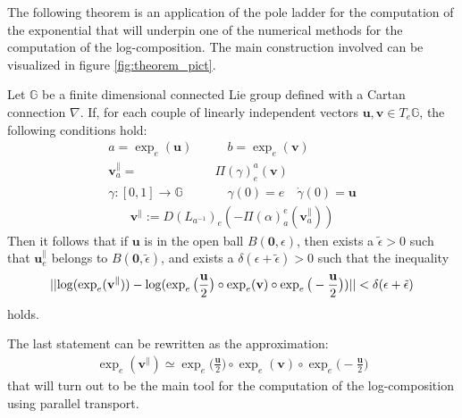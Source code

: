 \noindent
The following theorem is an application of the pole ladder \cite{lorenzi2011schild} for the computation of the exponential that will underpin one of the numerical methods for the computation of the log-composition. The main construction involved can be visualized in figure \ref{fig:theorem_pict}.
\begin{theorem}\label{th:local_approximation_theorem}
	Let $\mathbb{G}$ be a finite dimensional connected Lie group defined with a Cartan connection $\nabla$. 
	If, for each couple of linearly independent vectors $\mathbf{u}, \mathbf{v} \in T_{e}\mathbb{G}$, the following conditions hold:
	\begin{align*}
	a = \exp_{e}(\mathbf{u}) 
	\quad & \quad  
	b = \exp_{e}(\mathbf{v}) \\
	\mathbf{v}_{a}^{\parallel} = & \Pi(\gamma)_{e}^{a}(\mathbf{v})\\
	\gamma : [0,1] \rightarrow \mathbb{G} &\quad \gamma(0) = e \quad \dot{\gamma}(0) = \mathbf{u}
	\end{align*}
	\begin{align*}
	 \mathbf{v}^{\parallel} := D(L_{a^{-1}})_{e}( -\Pi(\alpha)_{a}^{e}(\mathbf{v}_{a}^{\parallel}))
	\end{align*}
	Then it follows that if $\mathbf{u}$ is in the open ball $B(\mathbf{0}, \epsilon)$, then exists a  $\tilde{\epsilon}>0$ such that $\mathbf{u}_{e}^{\parallel}$ belongs to $B(\mathbf{0}, \tilde{\epsilon})$, and exists a $\delta(\epsilon + \tilde{\epsilon})>0$ such that the inequality
	\begin{align*}
		\vert\lvert 
			\log(\exp_{e}(\mathbf{v}^{\parallel} ))
			-
			\log(\exp_{e}\big(\frac{\mathbf{u}}{2}\big)   
				\circ  \exp_{e}(\mathbf{v}) 
				\circ \exp_{e}\big(-\frac{\mathbf{u}}{2}\big))
			 \rvert\vert <\delta(\epsilon + \tilde{\epsilon})
	\end{align*}
	holds.
\end{theorem}
\noindent
The last statement can be rewritten as the approximation:
\begin{align}\label{eq:parallel_transport_main_approximation}
\exp_{e}(\mathbf{v}^{\parallel}) 
\simeq
\exp_{e}\big(\frac{\mathbf{u}}{2}\big)   
\circ  \exp_{e}(\mathbf{v}) 
\circ \exp_{e}\big(-\frac{\mathbf{u}}{2}\big)
\end{align}
that will turn out to be the main tool for the computation of the log-composition using parallel transport.\\

